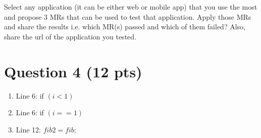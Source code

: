 \documentclass[12pt]{article}
\begin{document}
Select any application (it can be either web or mobile app) that you use the most and propose 3 MRs that can be used to test that application. Apply those MRs and share the results i.e. which MR(s) passed and which of them failed? Also, share the url of the application you tested.


\newpage
\section*{Question 4 (12 pts)}

\begin{enumerate}
    \item Line 6: if $(i < 1 )$
    \item Line 6: if $( i == 1 )$
    \item Line 12: $fib2 = fib$;
\end{enumerate}
\end{document}
